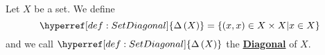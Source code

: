 \newcommand{\SetDiagonal}[0]{\textbf{\hyperref[def:SetDiagonal]{Diagonal}}\xspace}
\newcommand{\SetDiagonals}[0]{\textbf{\hyperref[def:SetDiagonal]{Diagonals}}\xspace}
\newcommand{\scSetDiagonal}[1]{\ensuremath{\hyperref[def:SetDiagonal]{\Delta\pa{#1}}}\xspace}
\begin{df}
\label{def:SetDiagonal}

\rm
    Let $X$ be a set. 
    We define 
    \begin{equation*}
	\scSetDiagonal{X}=\{(x,x)\in X \times X | x \in X\}
	\end{equation*}
    and we call 
    \scSetDiagonal{X} 
    the 
    \SetDiagonal
    of $X$.
\end{df}
